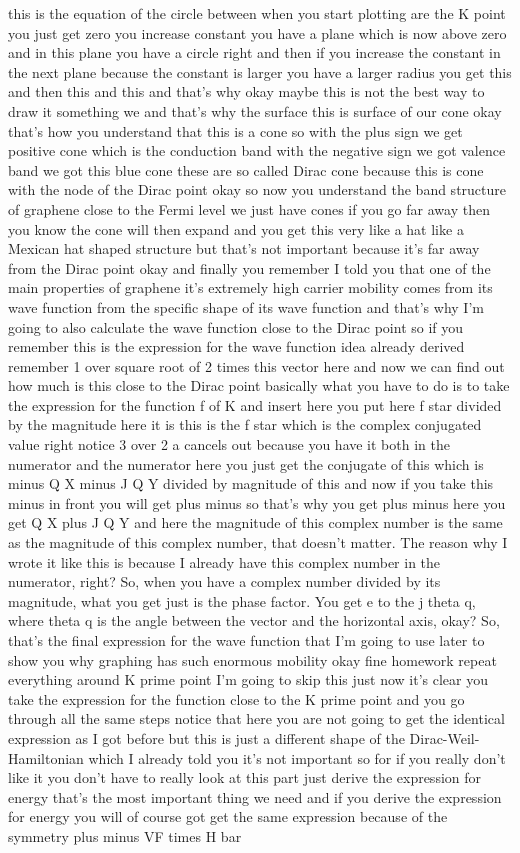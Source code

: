 this is the equation of the circle between when you start plotting are the K point you just get zero you increase constant you have a plane which is now above zero and in this plane you have a circle right and then if you increase the constant in the next plane because the constant is larger you have a larger radius you get this and then this and this and that's why okay maybe this is not the best way to draw it something we and that's why the surface this is surface of our cone okay that's how you understand that this is a cone so with the plus sign we get positive cone which is the conduction band with the negative sign we got valence band we got this blue cone these are so called Dirac cone because this is cone with the node of the Dirac point okay so now you understand the band structure of graphene close to the Fermi level we just have cones if you go far away then you know the cone will then expand and you get this very like a hat like a Mexican hat shaped structure but that's not important because it's far away from the Dirac point okay and finally you remember I told you that one of the main properties of graphene it's extremely high carrier mobility comes from its wave function from the specific shape of its wave function and that's why I'm going to also calculate the wave function close to the Dirac point so if you remember this is the expression for the wave function idea already derived remember 1 over square root of 2 times this vector here and now we can find out how much is this close to the Dirac point basically what you have to do is to take the expression for the function f of K and insert here you put here f star divided by the magnitude here it is this is the f star which is the complex conjugated value right notice 3 over 2 a cancels out because you have it both in the numerator and the numerator here you just get the conjugate of this which is minus Q X minus J Q Y divided by magnitude of this and now if you take this minus in front you will get plus minus so that's why you get plus minus here you get Q X plus J Q Y and here the magnitude of this complex number is the same as the magnitude of this complex number, that doesn't matter. The reason why I wrote it like this is because I already have this complex number in the numerator, right? So, when you have a complex number divided by its magnitude, what you get just is the phase factor. You get e to the j theta q, where theta q is the angle between the vector and the horizontal axis, okay? So, that's the final expression for the wave function that I'm going to use later to show you why graphing has such enormous mobility okay fine homework repeat everything around K prime point I'm going to skip this just now it's clear you take the expression for the function close to the K prime point and you go through all the same steps notice that here you are not going to get the identical expression as I got before but this is just a different shape of the Dirac-Weil-Hamiltonian which I already told you it's not important so for if you really don't like it you don't have to really look at this part just derive the expression for energy that's the most important thing we need and if you derive the expression for energy you will of course got get the same expression because of the symmetry plus minus VF times H bar 